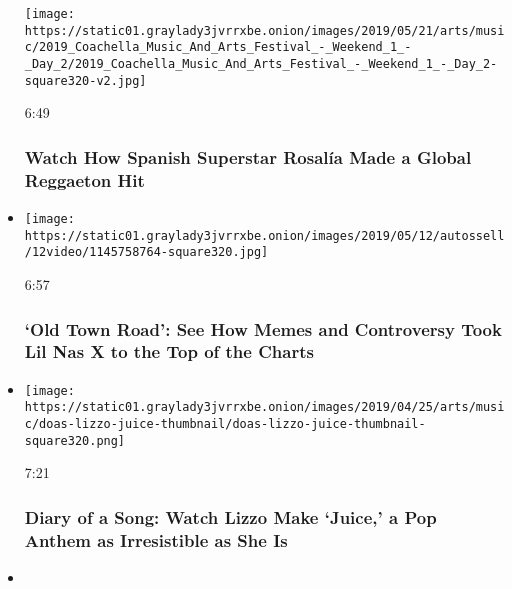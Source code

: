 \begin{itemize}
  \texttt{[image: https://static01.graylady3jvrrxbe.onion/images/2019/05/21/arts/music/2019\_Coachella\_Music\_And\_Arts\_Festival\_-\_Weekend\_1\_-\_Day\_2/2019\_Coachella\_Music\_And\_Arts\_Festival\_-\_Weekend\_1\_-\_Day\_2-square320-v2.jpg]}

  6:49

  \hypertarget{watch-how-spanish-superstar-rosaluxeda-made-a-global-reggaeton-hit}{%
  \subsubsection{Watch How Spanish Superstar Rosalía Made a Global
  Reggaeton
  Hit}\label{watch-how-spanish-superstar-rosaluxeda-made-a-global-reggaeton-hit}}
\item
  \href{https://www.nytimes3xbfgragh.onion/video/arts/music/100000006445156/old-town-road-lil-nas-x-billy-ray-cyrus.html?action=click\&module=video-series-bar\&region=header\&pgtype=Article\&playlistId=video/diaryofasong}{}

  \texttt{[image: https://static01.graylady3jvrrxbe.onion/images/2019/05/12/autossell/12video/1145758764-square320.jpg]}

  6:57

  \hypertarget{old-town-road-see-how-memes-and-controversy-took-lil-nas-x-to-the-top-of-the-charts}{%
  \subsubsection{`Old Town Road': See How Memes and Controversy Took Lil
  Nas X to the Top of the
  Charts}\label{old-town-road-see-how-memes-and-controversy-took-lil-nas-x-to-the-top-of-the-charts}}
\item
  \href{https://www.nytimes3xbfgragh.onion/video/arts/music/100000006417770/lizzo-juice.html?action=click\&module=video-series-bar\&region=header\&pgtype=Article\&playlistId=video/diaryofasong}{}

  \texttt{[image: https://static01.graylady3jvrrxbe.onion/images/2019/04/25/arts/music/doas-lizzo-juice-thumbnail/doas-lizzo-juice-thumbnail-square320.png]}

  7:21

  \hypertarget{diary-of-a-song-watch-lizzo-make-juice-a-pop-anthem-as-irresistible-as-she-is}{%
  \subsubsection{Diary of a Song: Watch Lizzo Make `Juice,' a Pop Anthem
  as Irresistible as She
  Is}\label{diary-of-a-song-watch-lizzo-make-juice-a-pop-anthem-as-irresistible-as-she-is}}
\item
  \href{https://www.nytimes3xbfgragh.onion/video/arts/music/100000006389803/billie-eilish-bury-a-friend.html?action=click\&module=video-series-bar\&region=header\&pgtype=Article\&playlistId=video/diaryofasong}{}


\end{itemize}
